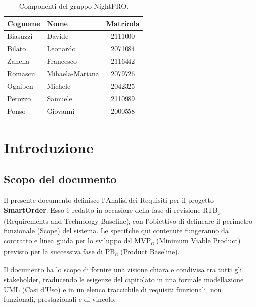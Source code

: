 \documentclass[a4paper, 11pt, oneside]{scrartcl} %
\begin{document}
\begin{table}[H]
    \centering
    \renewcommand{\arraystretch}{1.2}
    \begin{tabular}{@{}llc@{}}
        \toprule
        \textbf{Cognome} & \textbf{Nome}   & \textbf{Matricola} \\
        \midrule
        Biasuzzi         & Davide          & 2111000            \\
        Bilato           & Leonardo        & 2071084            \\
        Zanella          & Francesco       & 2116442            \\
        Romascu          & Mihaela-Mariana & 2079726            \\
        Ogniben          & Michele         & 2042325            \\
        Perozzo          & Samuele         & 2110989            \\
        Ponso            & Giovanni        & 2000558            \\
        \bottomrule
    \end{tabular}
    \caption{Componenti del gruppo NightPRO.}
\end{table}

\newpage
\section{Introduzione}

\subsection{Scopo del documento}
Il presente documento definisce l'Analisi dei Requisiti per il progetto \textbf{SmartOrder}. Esso è redatto in occasione della fase di revisione RTB\textsubscript{\textsc{g}} (Requirements and Technology Baseline), con l'obiettivo di delineare il perimetro funzionale (Scope) del sistema. Le specifiche qui contenute fungeranno da contratto e linea guida per lo sviluppo del MVP\textsubscript{\textsc{g}} (Minimum Viable Product) previsto per la successiva fase di PB\textsubscript{\textsc{g}} (Product Baseline).

Il documento ha lo scopo di fornire una visione chiara e condivisa tra tutti gli stakeholder, traducendo le esigenze del capitolato in una formale modellazione UML (Casi d'Uso) e in un elenco tracciabile di requisiti funzionali, non funzionali, prestazionali e di vincolo.
\end{document}
